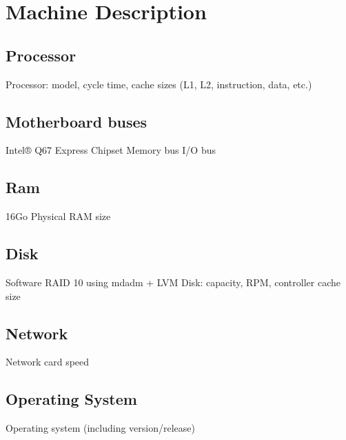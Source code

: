 \section{Machine Description}

\subsection{Processor}

    Processor: model, cycle time, cache sizes (L1, L2, instruction, data, etc.)
\subsection{Motherboard buses}
	Intel® Q67 Express Chipset
    Memory bus
    I/O bus

\subsection{Ram}
	16Go Physical
    RAM size

\subsection{Disk}
	Software RAID 10 using mdadm + LVM
    Disk: capacity, RPM, controller cache size

\subsection{Network}
    Network card speed

\subsection{Operating System}
    Operating system (including version/release) 
